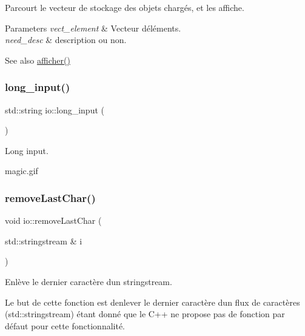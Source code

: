 Parcourt le vecteur de stockage des objets chargés, et les affiche. 
\begin{DoxyParams}{Parameters}
{\em vect\+\_\+element} & Vecteur d\textquotesingle{}éléments. \\
\hline
{\em need\+\_\+desc} & description ou non. \\
\hline
\end{DoxyParams}
\begin{DoxySeeAlso}{See also}
\hyperlink{namespaceio_ac5222293c3d12f7982a8df7ead04ba0b}{afficher()} 
\end{DoxySeeAlso}
\mbox{\label{namespaceio_ab044be3afd7ac04eeb1a496af0f1d5c6}} 
\subsubsection{\texorpdfstring{long\+\_\+input()}{long\_input()}}
{\footnotesize\ttfamily std\+::string io\+::long\+\_\+input (\begin{DoxyParamCaption}{ }\end{DoxyParamCaption})}



Long input. 

magic.\+gif \mbox{\label{namespaceio_a0ed486192687092d372440a79c3a65a3}} 
\subsubsection{\texorpdfstring{remove\+Last\+Char()}{removeLastChar()}}
{\footnotesize\ttfamily void io\+::remove\+Last\+Char (\begin{DoxyParamCaption}\item[{std\+::stringstream \&}]{i }\end{DoxyParamCaption})}



Enlève le dernier caractère d\textquotesingle{}un stringstream. 

Le but de cette fonction est d\textquotesingle{}enlever le dernier caractère d\textquotesingle{}un flux de caractères (std\+::stringstream) étant donné que le C++ ne propose pas de fonction par défaut pour cette fonctionnalité.

